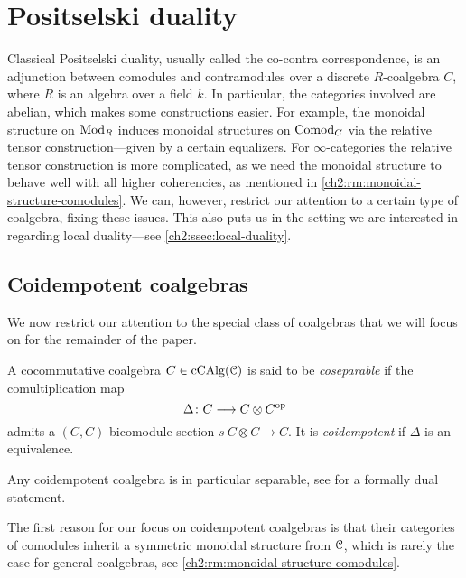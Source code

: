 
\section{Positselski duality}
\label{ch2:sec:positselski-duality}

Classical Positselski duality, usually called the co-contra correspondence, is an adjunction between comodules and contramodules over a discrete $R$-coalgebra $C$, where $R$ is an algebra over a field $k$. In particular, the categories involved are abelian, which makes some constructions easier. For example, the monoidal structure on $\mathrm{Mod}_R$ induces monoidal structures on $\mathrm{Comod}_C$ via the relative tensor construction---given by a certain equalizers. For $\infty$-categories the relative tensor construction is more complicated, as we need the monoidal structure to behave well with all higher coherencies, as mentioned in \cref{ch2:rm:monoidal-structure-comodules}. We can, however, restrict our attention to a certain type of coalgebra, fixing these issues. This also puts us in the setting we are interested in regarding local duality---see \cref{ch2:ssec:local-duality}. 

\subsection{Coidempotent coalgebras}
\label{ch2:ssec:coidempotent-coalgebras}

We now restrict our attention to the special class of coalgebras that we will focus on for the remainder of the paper. 

\begin{definition}
    A cocommutative coalgebra $C\in \operatorname{cCAlg}(\EuScript{C})$ is said to be \emph{coseparable} if the comultiplication map 
    \[\Delta\colon C\longrightarrow C\otimes C^{\mathrm{op}}\] 
    admits a $(C,C)$-bicomodule section $s\: C\otimes C\to C$. It is \emph{coidempotent} if $\Delta$ is an equivalence. 
\end{definition}

\begin{remark}
    \label{ch2:rm:coidempotent-implies-separable}
    Any coidempotent coalgebra is in particular separable, see \cite[1.6(1)]{ramzi_2023} for a formally dual statement. 
\end{remark}

The first reason for our focus on coidempotent coalgebras is that their categories of comodules inherit a symmetric monoidal structure from $\EuScript{C}$, which is rarely the case for general coalgebras, see \cref{ch2:rm:monoidal-structure-comodules}. 

